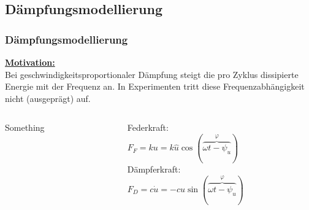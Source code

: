 \subsection{Dämpfungsmodellierung}

\begin{frame}
\frametitle{Dämpfungsmodellierung}
        \textbf{\underline{Motivation:}} \\
        Bei geschwindigkeitsproportionaler Dämpfung steigt die pro Zyklus dissipierte Energie
        mit der Frequenz an. In Experimenten tritt diese Frequenzabhängigkeit nicht (ausgeprägt) auf.
\end{frame}

\begin{frame}
        \begin{columns}
                \begin{column}[t]{.5 \linewidth}
                        Something
                \end{column}

                \begin{column}[t]{.5 \linewidth}
                        Federkraft: \\
                        $F_F = k u = k \hat{u} \cos(\overbrace{\omega t - \psi_u}^\varphi)$ 
                        \vspace{0.3cm} \\
                        Dämpferkraft: \\
                        $F_D = c \dot{u} = -c \hat{u} \sin(\overbrace{\omega t - \psi_u}^\varphi)$ \\
                \end{column}
        \end{columns}
\end{frame}

